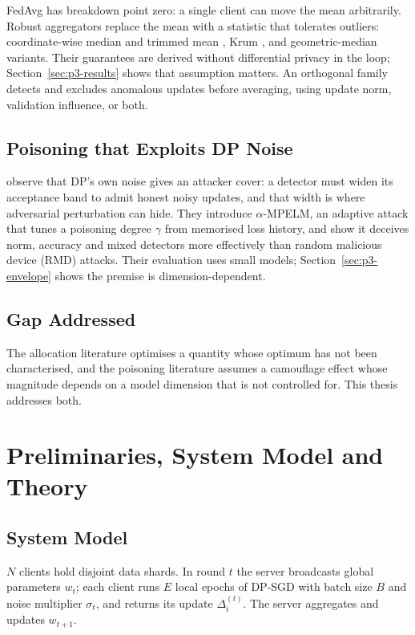 FedAvg has breakdown point zero: a single client can move the mean arbitrarily.
Robust aggregators replace the mean with a statistic that tolerates outliers:
coordinate-wise median and trimmed mean \citep{yin2018byzantine}, Krum
\citep{blanchard2017machine}, and geometric-median variants. Their guarantees are
derived without differential privacy in the loop; Section~\ref{sec:p3-results}
shows that assumption matters. An orthogonal family detects and excludes anomalous
updates before averaging, using update norm, validation influence, or both.

\section{Poisoning that Exploits DP Noise}

\citet{hossain2025exploiting} observe that DP's own noise gives an attacker
cover: a detector must widen its acceptance band to admit honest noisy updates,
and that width is where adversarial perturbation can hide. They introduce
$\alpha$-MPELM, an adaptive attack that tunes a poisoning degree $\gamma$ from
memorised loss history, and show it deceives norm, accuracy and mixed detectors
more effectively than random malicious device (RMD) attacks. Their evaluation
uses small models; Section~\ref{sec:p3-envelope} shows the premise is
dimension-dependent.

\section{Gap Addressed}

The allocation literature optimises a quantity whose optimum has not been
characterised, and the poisoning literature assumes a camouflage effect whose
magnitude depends on a model dimension that is not controlled for. This thesis
addresses both.


\chapter{Preliminaries, System Model and Theory}

\section{System Model}

$N$ clients hold disjoint data shards. In round $t$ the server broadcasts global
parameters $w_t$; each client runs $E$ local epochs of DP-SGD with batch size $B$
and noise multiplier $\sigma_t$, and returns its update $\Delta_i^{(t)}$. The
server aggregates and updates $w_{t+1}$.

